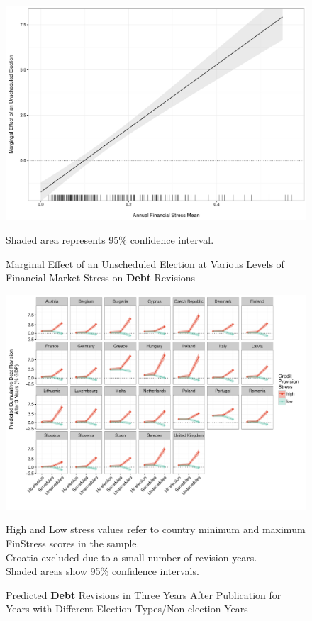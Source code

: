 \documentclass[]{article}
\begin{document}
\begin{figure}
    \caption{Marginal Effect of an Unscheduled Election at Various Levels of Financial Market Stress on \textbf{Debt} Revisions}
    \label{me_finstress_endog_elect}

    \begin{center}
        \includegraphics[scale=0.4]{figures/fsi_unscheduled_debt_me.pdf}
    \end{center}

	{\scriptsize{Shaded area represents 95\% confidence interval.}}

\end{figure}

\begin{figure}
	\caption{Predicted \textbf{Debt} Revisions in Three Years After Publication for Years with Different Election Types/Non-election Years}
    \label{country_predict_debt_required}
    \begin{center}
    	\includegraphics[scale=0.7]{figures/country_predict_required.pdf}
    \end{center}

	{\scriptsize{High and Low stress values refer to country minimum and maximum FinStress scores in the sample.\\
    Croatia excluded due to a small number of revision years.\\
    Shaded areas show 95\% confidence intervals.
}}

\end{figure}
\end{document}
